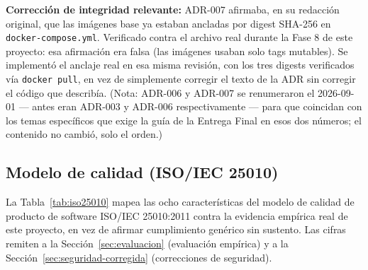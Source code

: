 \textbf{Corrección de integridad relevante:} ADR-007 afirmaba, en su redacción original, que las
imágenes base ya estaban ancladas por digest SHA-256 en \texttt{docker-compose.yml}. Verificado contra el
archivo real durante la Fase 8 de este proyecto: esa afirmación era falsa (las imágenes usaban solo tags
mutables). Se implementó el anclaje real en esa misma revisión, con los tres digests verificados vía
\texttt{docker pull}, en vez de simplemente corregir el texto de la ADR sin corregir el código que
describía. (Nota: ADR-006 y ADR-007 se renumeraron el 2026-09-01 --- antes eran ADR-003 y ADR-006
respectivamente --- para que coincidan con los temas específicos que exige la guía de la Entrega Final
en esos dos números; el contenido no cambió, solo el orden.)

\subsection{Modelo de calidad (ISO/IEC 25010)}

La Tabla~\ref{tab:iso25010} mapea las ocho características del modelo de calidad de producto de software
ISO/IEC 25010:2011 \cite{iso25010} contra la evidencia empírica real de este proyecto, en vez de afirmar
cumplimiento genérico sin sustento. Las cifras remiten a la Sección~\ref{sec:evaluacion} (evaluación
empírica) y a la Sección~\ref{sec:seguridad-corregida} (correcciones de seguridad).

